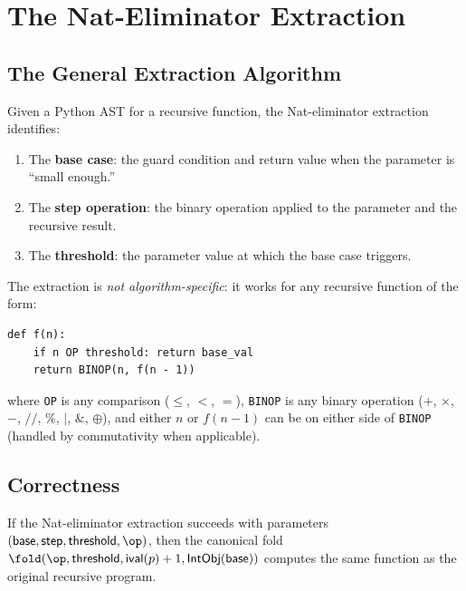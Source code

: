 
\chapter{The Nat-Eliminator Extraction}
\label{ch:nat-elim}

\section{The General Extraction Algorithm}

Given a Python AST for a recursive function, the Nat-eliminator
extraction identifies:
\begin{enumerate}
  \item The \textbf{base case}: the guard condition and return value
    when the parameter is ``small enough.''
  \item The \textbf{step operation}: the binary operation applied to
    the parameter and the recursive result.
  \item The \textbf{threshold}: the parameter value at which the
    base case triggers.
\end{enumerate}

The extraction is \emph{not algorithm-specific}: it works for any
recursive function of the form:
\begin{lstlisting}
def f(n):
    if n OP threshold: return base_val
    return BINOP(n, f(n - 1))
\end{lstlisting}
where \texttt{OP} is any comparison ($\leq$, $<$, $=$), \texttt{BINOP}
is any binary operation ($+$, $\times$, $-$, $//$, $\%$, $|$, $\&$,
$\oplus$), and either $n$ or $f(n-1)$ can be on either side of
\texttt{BINOP} (handled by commutativity when applicable).

\section{Correctness}

\begin{theorem}
If the Nat-eliminator extraction succeeds with parameters
$(\mathsf{base}, \mathsf{step}, \mathsf{threshold}, \op)$, then the
canonical fold $\fold(\op, \mathsf{threshold}, \mathsf{ival}(p) + 1,
\mathsf{IntObj}(\mathsf{base}))$ computes the same function as the
original recursive program.
\end{theorem}

